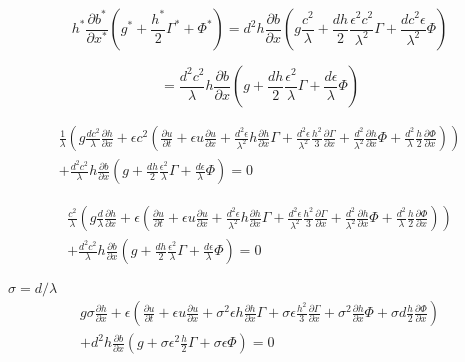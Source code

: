 \documentclass[12pt]{article}
\begin{document}
\[h^* \frac{\partial b^*}{\partial x^*}\left(g^* + \frac{h^*}{2}\Gamma^* + \Phi^*\right) = d^2h \frac{\partial b}{\partial x}\left(g \frac{c^2}{\lambda} + \frac{dh}{2}\frac{\epsilon^2 c^2}{\lambda^2} \Gamma + \frac{dc^2\epsilon}{\lambda^2}\Phi \right) \]

\[= \frac{d^2 c^2}{\lambda}h \frac{\partial b}{\partial x}\left(g + \frac{dh}{2}\frac{\epsilon^2 }{\lambda} \Gamma + \frac{d\epsilon}{\lambda}\Phi \right) \]

\begin{equation}
\begin{split}
\frac{1}{\lambda}\left(g \frac{dc^2}{\lambda}\frac{\partial h}{\partial x} + \epsilon c^2\left( \frac{\partial u}{\partial t } + \epsilon u \frac{\partial u}{\partial x} + \frac{d^2\epsilon}{\lambda^2} h\frac{\partial h}{\partial x} \Gamma  + \frac{d^2 \epsilon}{\lambda^2} \frac{h^2}{3}\frac{\partial \Gamma}{\partial x}+ \frac{d^2}{\lambda^2} \frac{\partial h}{\partial x}\Phi + \frac{d^2}{\lambda}\frac{h}{2}\frac{\partial \Phi}{\partial x} \right)\right) \\ + \frac{d^2 c^2}{\lambda}h \frac{\partial b}{\partial x}\left(g + \frac{dh}{2}\frac{\epsilon^2 }{\lambda} \Gamma + \frac{d\epsilon}{\lambda}\Phi \right) = 0
\end{split}
\end{equation}

\begin{equation}
\begin{split}
\frac{c^2}{\lambda}\left(g \frac{d}{\lambda}\frac{\partial h}{\partial x} + \epsilon\left( \frac{\partial u}{\partial t } + \epsilon u \frac{\partial u}{\partial x} + \frac{d^2\epsilon}{\lambda^2} h\frac{\partial h}{\partial x} \Gamma  + \frac{d^2 \epsilon}{\lambda^2} \frac{h^2}{3}\frac{\partial \Gamma}{\partial x}+ \frac{d^2}{\lambda^2} \frac{\partial h}{\partial x}\Phi + \frac{d^2}{\lambda}\frac{h}{2}\frac{\partial \Phi}{\partial x} \right)\right) \\ + \frac{d^2 c^2}{\lambda}h \frac{\partial b}{\partial x}\left(g + \frac{dh}{2}\frac{\epsilon^2 }{\lambda} \Gamma + \frac{d\epsilon}{\lambda}\Phi \right) = 0
\end{split}
\end{equation}


$\sigma = d/\lambda$
\begin{equation}
\begin{split}
g \sigma\frac{\partial h}{\partial x} + \epsilon\left( \frac{\partial u}{\partial t } + \epsilon u \frac{\partial u}{\partial x} + \sigma^2 \epsilon h\frac{\partial h}{\partial x} \Gamma  + \sigma \epsilon \frac{h^2}{3}\frac{\partial \Gamma}{\partial x}+ \sigma^2 \frac{\partial h}{\partial x}\Phi + \sigma d\frac{h}{2}\frac{\partial \Phi}{\partial x} \right) \\ + d^2h \frac{\partial b}{\partial x}\left(g + \sigma \epsilon^2 \frac{h}{2} \Gamma + \sigma \epsilon\Phi \right) = 0
\end{split}
\end{equation}
\end{document}
